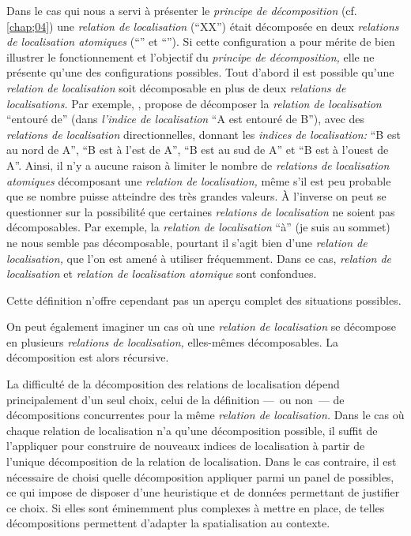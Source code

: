 Dans le cas qui nous a servi à présenter le \emph{principe de
  décomposition} (cf. \autoref{chap;04}) une \emph{relation de
  localisation} (\enquote{XX}) était décomposée en deux
\emph{relations de localisation atomiques} (\enquote{} et
\enquote{}). Si cette configuration a pour mérite de bien illustrer le
fonctionnement et l'objectif du \emph{principe de décomposition,} elle
ne présente qu'une des configurations possibles. Tout d'abord il est
possible qu'une \emph{relation de localisation} soit décomposable en
plus de deux \emph{relations de localisations.} Par exemple,
\textcite{Vanegas2011}, propose de décomposer la \emph{relation de
  localisation} \enquote{entouré de} (dans \emph{l'indice de
  localisation} \enquote{A est entouré de B}), avec des
\emph{relations de localisation} directionnelles, donnant les
\emph{indices de localisation:} \enquote{B est au nord de A},
\enquote{B est à l'est de A}, \enquote{B est au sud de A} et
\enquote{B est à l'ouest de A}. Ainsi, il n'y a aucune raison à
limiter le nombre de \emph{relations de localisation atomiques}
décomposant une \emph{relation de localisation,} même s'il est peu
probable que se nombre puisse atteindre des très grandes valeurs. À
l'inverse on peut se questionner sur la possibilité que certaines
\emph{relations de localisation} ne soient pas décomposables. Par
exemple, la \emph{relation de localisation} \enquote{à} (\eg je suis
au sommet) ne nous semble pas décomposable, pourtant il s'agit bien
d'une \emph{relation de localisation,} que l'on est amené à utiliser
fréquemment. Dans ce cas, \emph{relation de localisation} et
\emph{relation de localisation atomique} sont confondues.

Cette définition n'offre cependant pas un aperçu complet des
situations possibles.

On peut également imaginer un cas où une \emph{relation de
  localisation} se décompose en plusieurs \emph{relations de
  localisation,} elles-mêmes décomposables. La décomposition est alors
récursive.





La difficulté de la décomposition des relations de localisation dépend
principalement d'un seul choix, celui de la définition ---~ou non~---
de décompositions concurrentes pour la même \emph{relation de
  localisation.} Dans le cas où chaque relation de localisation n'a
qu'une décomposition possible, il suffit de l'appliquer pour
construire de nouveaux indices de localisation à partir de l'unique
décomposition de la relation de localisation. Dans le cas contraire,
il est nécessaire de choisi quelle décomposition appliquer parmi un
panel de possibles, ce qui impose de disposer d'une heuristique et de
données permettant de justifier ce choix. Si elles sont éminemment
plus complexes à mettre en place, de telles décompositions permettent
d’adapter la spatialisation au contexte.




